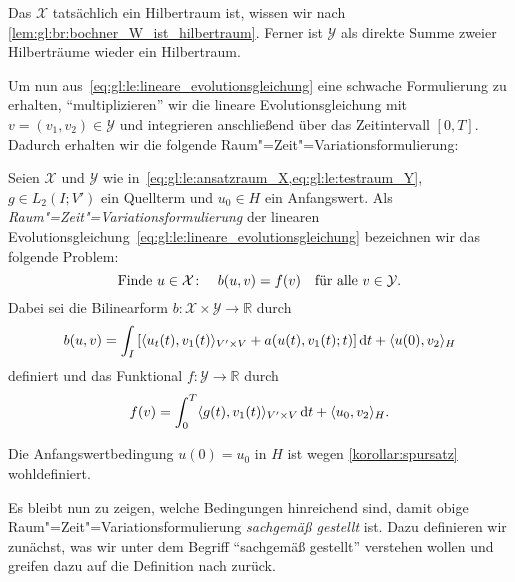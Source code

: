 Das $\mathcal X$ tatsächlich ein Hilbertraum ist, wissen wir nach \cref{lem:gl:br:bochner_W_ist_hilbertraum}.
Ferner ist $\mathcal Y$ als direkte Summe zweier Hilberträume wieder ein Hilbertraum.

Um nun aus~\cref{eq:gl:le:lineare_evolutionsgleichung} eine schwache Formulierung zu erhalten, \enquote{multiplizieren} wir die lineare Evolutionsgleichung mit $v = (v_{1}, v_{2}) \in \mathcal Y$ und integrieren anschließend über das Zeitintervall $[0, T]$.
Dadurch erhalten wir die folgende Raum"=Zeit"=Variationsformulierung:

\begin{Definition}
\label{def:gl:le:schwache_raum_zeit_formulierung}
    Seien $\mathcal X$ und $\mathcal Y$ wie in~\cref{eq:gl:le:ansatzraum_X,eq:gl:le:testraum_Y}, $g \in L_{2}(I; V')$ ein Quellterm und $u_{0} \in H$ ein Anfangswert.
    Als \emph{Raum"=Zeit"=Variationsformulierung} der linearen Evolutionsgleichung~\cref{eq:gl:le:lineare_evolutionsgleichung} bezeichnen wir das folgende Problem:
    \begin{equation}
        \label{eq:gl:le:schwache_formulierung}
        \text{Finde } u \in \mathcal X \colon \quad b(u, v) = f(v) \quad \fa v \in \mathcal Y.
    \end{equation}
    Dabei sei die Bilinearform $b \colon \mathcal X \times \mathcal Y \to \mathbb{R}$ durch
    \begin{equation}
        \label{eq:gl:le:schwache_formulierung_lhs_b}
        b(u, v) = \int_{I} \left[   \skp{u_{t}(t)}{v_{1}(t)}{V' \times V} + a(u(t), v_{1}(t); t)  \right] \diff t + \skp{u(0)}{v_{2}}{H}
    \end{equation}
    definiert und das Funktional $f \colon \mathcal Y \to \mathbb{R}$ durch
    \begin{equation}
        \label{eq:gl:le:schwache_formulierung_rhs_f}
        f(v) = \int_{0}^{T} \skp{g(t)}{v_{1}(t)}{V' \times V} \diff t + \skp{u_{0}}{v_{2}}{H}.
    \end{equation}
\end{Definition}

\begin{Bemerkung}
    Die Anfangswertbedingung $u(0) = u_{0}$ in $H$ ist wegen \cref{korollar:spursatz} wohldefiniert.
\end{Bemerkung}

Es bleibt nun zu zeigen, welche Bedingungen hinreichend sind, damit obige Raum"=Zeit"=Variationsformulierung \emph{sachgemäß gestellt} ist.
Dazu definieren wir zunächst, was wir unter dem Begriff \enquote{sachgemäß gestellt} verstehen wollen und greifen dazu auf die Definition nach \textcite{hadamard1902problemes} zurück.

